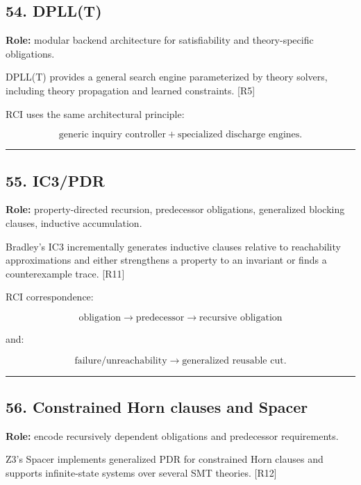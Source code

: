 \documentclass[
]{article}
\begin{document}
\subsection{54. DPLL(T)}\label{dpllt}

\textbf{Role:} modular backend architecture for satisfiability and
theory-specific obligations.

DPLL(T) provides a general search engine parameterized by theory
solvers, including theory propagation and learned constraints. {[}R5{]}

RCI uses the same architectural principle:

\[
\boxed{
\text{generic inquiry controller}
+
\text{specialized discharge engines}.
}
\]

\begin{center}\rule{0.5\linewidth}{0.5pt}\end{center}

\subsection{55. IC3/PDR}\label{ic3pdr}

\textbf{Role:} property-directed recursion, predecessor obligations,
generalized blocking clauses, inductive accumulation.

Bradley's IC3 incrementally generates inductive clauses relative to
reachability approximations and either strengthens a property to an
invariant or finds a counterexample trace. {[}R11{]}

RCI correspondence:

\[
\boxed{
\text{obligation}
\to
\text{predecessor}
\to
\text{recursive obligation}
}
\]

and:

\[
\boxed{
\text{failure/unreachability}
\to
\text{generalized reusable cut}.
}
\]

\begin{center}\rule{0.5\linewidth}{0.5pt}\end{center}

\subsection{56. Constrained Horn clauses and
Spacer}\label{constrained-horn-clauses-and-spacer}

\textbf{Role:} encode recursively dependent obligations and predecessor
requirements.

Z3's Spacer implements generalized PDR for constrained Horn clauses and
supports infinite-state systems over several SMT theories. {[}R12{]}
\end{document}
